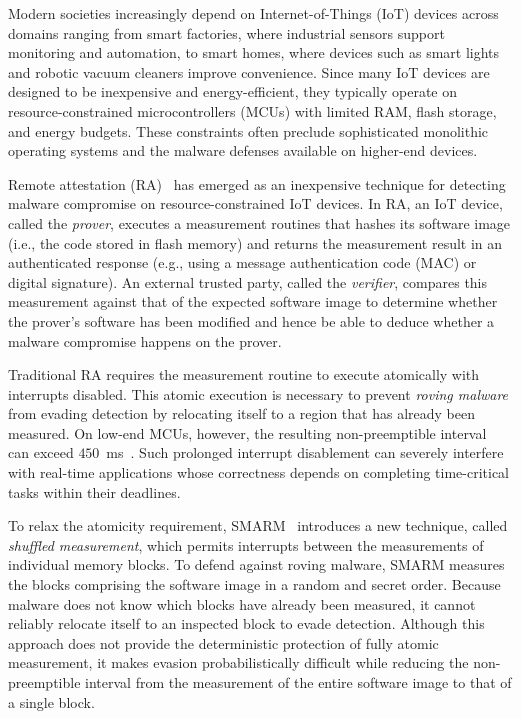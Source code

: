 \documentclass[conference]{IEEEtran}
\begin{document}
Modern societies increasingly depend on Internet-of-Things (IoT) devices across domains ranging from smart factories, where industrial sensors support monitoring and automation, to smart homes, where devices such as smart lights and robotic vacuum cleaners improve convenience. 
Since many IoT devices are designed to be inexpensive and energy-efficient, they typically operate on resource-constrained microcontrollers (MCUs) with limited RAM, flash storage, and energy budgets. These constraints often preclude sophisticated monolithic operating systems and the malware defenses available on higher-end devices.

Remote attestation (RA)~\cite{eldefrawy2012smart,nunes2019vrased,eldefrawy2017hydra} has emerged as an inexpensive technique for detecting malware compromise on resource-constrained IoT devices. In RA, an IoT device, called the \emph{prover}, executes a measurement routines that hashes its software image (i.e., the code stored in flash memory) and returns the measurement result in an authenticated response (e.g., using a message authentication code (MAC) or digital signature). 
An external trusted party, called the \emph{verifier}, compares this measurement against that of the expected software image to determine whether the prover's software has been modified and hence be able to deduce whether a malware compromise happens on the prover.

Traditional RA requires the measurement routine to execute atomically with interrupts disabled. This atomic execution is necessary to prevent \emph{roving malware} from evading detection by relocating itself to a region that has already been measured. On low-end MCUs, however, the resulting non-preemptible interval can exceed $450$~ms~\cite{nunes2019vrased}. Such prolonged interrupt disablement can severely interfere with real-time applications whose correctness depends on completing time-critical tasks within their deadlines.

To relax the atomicity requirement, SMARM~\cite{carpent2018smarm} introduces a new technique, called \emph{shuffled measurement}, which permits interrupts between the measurements of individual memory blocks. To defend against roving malware, SMARM measures the blocks comprising the software image in a random and secret order. Because malware does not know which blocks have already been measured, it cannot reliably relocate itself to an inspected block to evade detection. Although this approach does not provide the deterministic protection of fully atomic measurement, it makes evasion probabilistically difficult while reducing the non-preemptible interval from the measurement of the entire software image to that of a single block.
\end{document}
